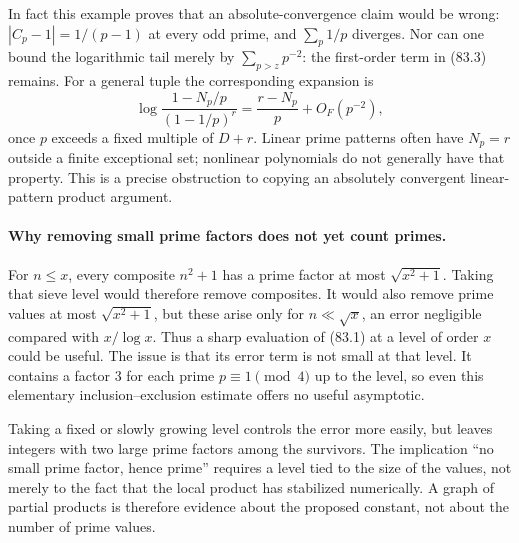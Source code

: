 \documentclass[11pt]{article}
\begin{document}
In fact this example proves that an absolute-convergence claim would be
wrong: $|C_p-1|=1/(p-1)$ at every odd prime, and
$\sum_p1/p$ diverges. Nor can one bound the logarithmic tail merely by
$\sum_{p>z}p^{-2}$: the first-order term in (83.3) remains. For a general
tuple the corresponding expansion is
\[
 \log\frac{1-N_p/p}{(1-1/p)^r}
       =\frac{r-N_p}{p}+O_F(p^{-2}),                    \tag{83.4}
\]
once $p$ exceeds a fixed multiple of $D+r$. Linear prime patterns often
have $N_p=r$ outside a finite exceptional set; nonlinear polynomials do
not generally have that property. This is a precise obstruction to
copying an absolutely convergent linear-pattern product argument.

\paragraph{Why removing small prime factors does not yet count primes.}
For $n\leq x$, every composite $n^2+1$ has a prime factor at most
$\sqrt{x^2+1}$. Taking that sieve level would therefore remove composites.
It would also remove prime values at most $\sqrt{x^2+1}$, but these arise
only for $n\ll\sqrt x$, an error negligible compared with $x/\log x$.
Thus a sharp evaluation of (83.1) at a level of order $x$ could be useful.
The issue is that its error term is not small at that level. It contains
a factor $3$ for each prime $p\equiv1\pmod4$ up to the level, so even
this elementary inclusion--exclusion estimate offers no useful asymptotic.

Taking a fixed or slowly growing level controls the error more easily,
but leaves integers with two large prime factors among the survivors.
The implication ``no small prime factor, hence prime'' requires a level
tied to the size of the values, not merely to the fact that the local
product has stabilized numerically. A graph of partial products is
therefore evidence about the proposed constant, not about the number
of prime values.
\end{document}
